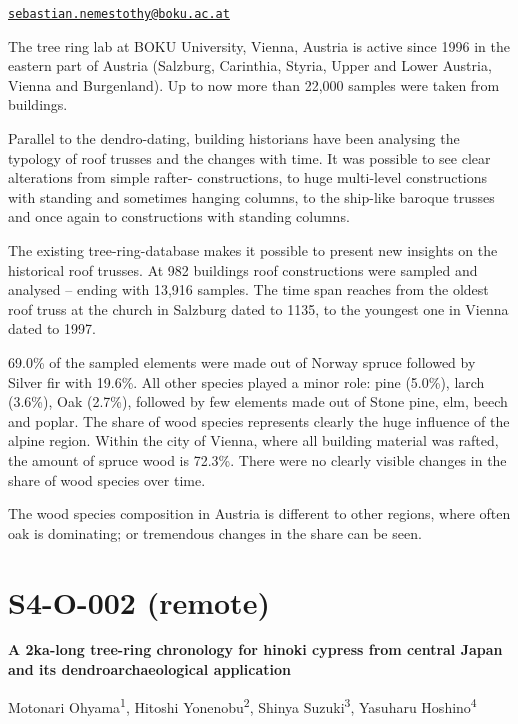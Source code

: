 \documentclass[
]{book}
\begin{document}
\href{mailto:sebastian.nemestothy@boku.ac.at}{\nolinkurl{sebastian.nemestothy@boku.ac.at}}

The tree ring lab at BOKU University, Vienna, Austria is active since 1996 in the eastern part of Austria (Salzburg, Carinthia, Styria, Upper and Lower Austria, Vienna and Burgenland). Up to now more than 22,000 samples were taken from buildings.

Parallel to the dendro-dating, building historians have been analysing the typology of roof trusses and the changes with time. It was possible to see clear alterations from simple rafter- constructions, to huge multi-level constructions with standing and sometimes hanging columns, to the ship-like baroque trusses and once again to constructions with standing columns.

The existing tree-ring-database makes it possible to present new insights on the historical roof trusses. At 982 buildings roof constructions were sampled and analysed -- ending with 13,916 samples. The time span reaches from the oldest roof truss at the church in Salzburg dated to 1135, to the youngest one in Vienna dated to 1997.

69.0\% of the sampled elements were made out of Norway spruce followed by Silver fir with 19.6\%. All other species played a minor role: pine (5.0\%), larch (3.6\%), Oak (2.7\%), followed by few elements made out of Stone pine, elm, beech and poplar. The share of wood species represents clearly the huge influence of the alpine region. Within the city of Vienna, where all building material was rafted, the amount of spruce wood is 72.3\%. There were no clearly visible changes in the share of wood species over time.

The wood species composition in Austria is different to other regions, where often oak is dominating; or tremendous changes in the share can be seen.

\hypertarget{s4-o-002-remote}{%
\section*{S4-O-002 (remote)}\label{s4-o-002-remote}}

\textbf{A 2ka-long tree-ring chronology for hinoki cypress from central Japan and its dendroarchaeological application}

Motonari Ohyama\textsuperscript{1}, Hitoshi Yonenobu\textsuperscript{2}, Shinya Suzuki\textsuperscript{3}, Yasuharu Hoshino\textsuperscript{4}
\end{document}
